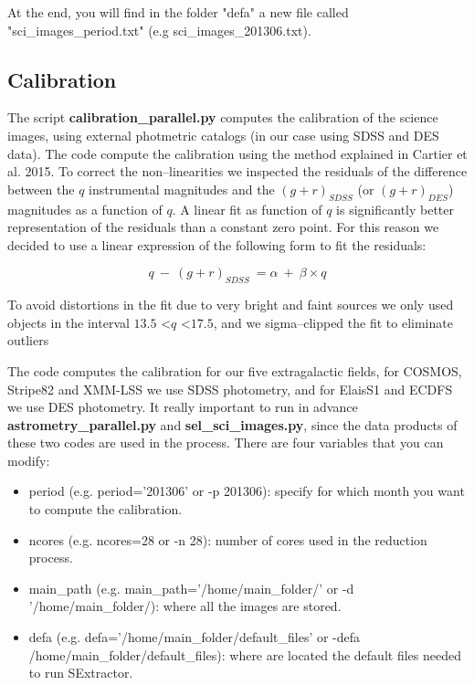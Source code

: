 \documentclass[letter, 12pt]{article}
\begin{document}
At the end, you will find in the folder "defa" a new file called "sci\_images\_period.txt" (e.g sci\_images\_201306.txt).


\subsection{Calibration}

The script \textbf{calibration\_parallel.py} computes the calibration of the science images, using external photmetric catalogs (in our case using SDSS and DES data). The code compute the calibration using the method explained in Cartier et al. 2015. To correct the non--linearities we inspected the residuals of the difference between the $q$ instrumental magnitudes and the $(g+r)_{SDSS}$ (or $(g+r)_{DES}$) magnitudes as a function of $q$. A linear fit as function of $q$ is significantly better representation of the residuals than a constant zero point. For this reason we decided to use a linear expression of the following form to fit the residuals: 

\begin{equation}
q~-~(g+r)_{SDSS}~=\alpha~+~\beta \times q
\label{res_eq}
\end{equation}

\noindent To avoid distortions in the fit due to very bright and faint sources we only used objects in the interval 
$13.5$ \textless $q$ \textless $17.5$, and we sigma--clipped the fit to eliminate outliers

\vspace{0.2cm}

The code computes the calibration for our five extragalactic fields, for COSMOS, Stripe82 and XMM-LSS we use SDSS photometry, and for ElaisS1 and ECDFS we use DES photometry. It really important to run in advance \textbf{astrometry\_parallel.py} and  \textbf{sel\_sci\_images.py}, since the data products of these two codes are used in the process. There are four variables that you can modify: 

\begin{itemize}

\item period (e.g. period='201306' or -p 201306): specify for which month you want to compute the calibration.

\item ncores (e.g. ncores=28 or -n 28): number of cores used in the reduction process.


\item main\_path (e.g. main\_path='/home/main\_folder/' or -d '/home/main\_folder/): where all the images are stored.

\item defa (e.g. defa='/home/main\_folder/default\_files' or -defa /home/main\_folder/default\_files): where are located the default files needed to run SExtractor.

\end{itemize}
\end{document}
